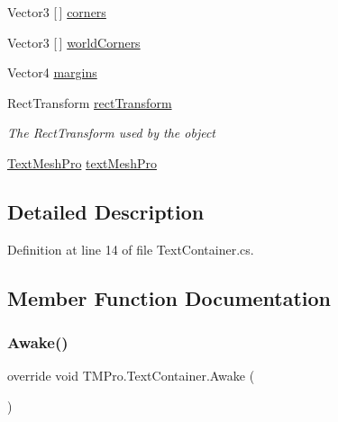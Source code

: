 \begin{DoxyCompactItemize}
\item 
Vector3 \mbox{[}$\,$\mbox{]} \mbox{\hyperlink{class_t_m_pro_1_1_text_container_a87118ed8a2ea2d53256a4716de16dd73}{corners}}
\item 
Vector3 \mbox{[}$\,$\mbox{]} \mbox{\hyperlink{class_t_m_pro_1_1_text_container_a0beb8af09797cfe92345a48378405cea}{world\+Corners}}
\item 
Vector4 \mbox{\hyperlink{class_t_m_pro_1_1_text_container_af15a109e2fb2242bd2a19560e8a91d0d}{margins}}
\item 
Rect\+Transform \mbox{\hyperlink{class_t_m_pro_1_1_text_container_a2676c068382669619c447d390e2c2a54}{rect\+Transform}}
\begin{DoxyCompactList}\small\item\em The Rect\+Transform used by the object \end{DoxyCompactList}\item 
\mbox{\hyperlink{class_t_m_pro_1_1_text_mesh_pro}{Text\+Mesh\+Pro}} \mbox{\hyperlink{class_t_m_pro_1_1_text_container_adf8a50e4acdd21586b22c5b0939cd3bc}{text\+Mesh\+Pro}}
\end{DoxyCompactItemize}


\subsection{Detailed Description}


Definition at line 14 of file Text\+Container.\+cs.



\subsection{Member Function Documentation}
\mbox{\label{class_t_m_pro_1_1_text_container_a6cac443954b176d57ec96cb3e2b79b92}} 
\subsubsection{\texorpdfstring{Awake()}{Awake()}}
{\footnotesize\ttfamily override void T\+M\+Pro.\+Text\+Container.\+Awake (\begin{DoxyParamCaption}{ }\end{DoxyParamCaption})\hspace{0.3cm}{\ttfamily [protected]}}



